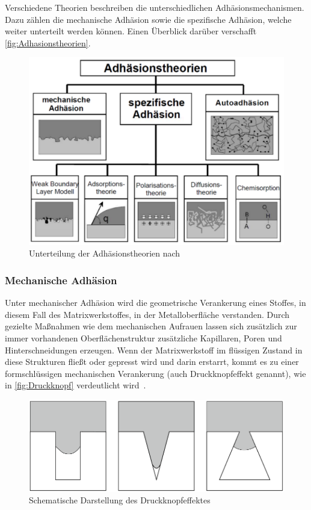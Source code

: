 Verschiedene Theorien beschreiben die unterschiedlichen Adhäsionsmechanismen.
Dazu zählen die mechanische Adhäsion sowie die spezifische Adhäsion, welche weiter unterteilt werden können.
Einen Überblick darüber verschafft \autoref{fig:Adhasionstheorien}.

\begin{figure}[H]%
    \centering
    \includegraphics[width=0.6\linewidth]{Bilder/SdT/Adhasionstheorien}
    \caption[Unterteilung der Adhäsionstheorien]{Unterteilung der Adhäsionstheorien nach~\cite{Garbassi1998}}
    \label{fig:Adhasionstheorien}
\end{figure}

\subsubsection{Mechanische Adhäsion}

Unter mechanischer Adhäsion wird die geometrische Verankerung eines Stoffes, in diesem Fall des Matrixwerkstoffes, in der Metalloberfläche verstanden.
Durch gezielte Maßnahmen wie dem mechanischen Aufrauen lassen sich zusätzlich zur immer vorhandenen Oberflächenstruktur zusätzliche Kapillaren, Poren und Hinterschneidungen erzeugen.
Wenn der Matrixwerkstoff im flüssigen Zustand in diese Strukturen fließt oder gepresst wird und darin erstarrt, kommt es zu einer formschlüssigen mechanischen Verankerung (auch Druckknopfeffekt genannt), wie in \autoref{fig:Druckknopf} verdeutlicht wird~\cite{Habenicht2009,Mittal1999}.


\begin{figure}[H]%
    \centering
    \includegraphics[width=0.6\linewidth]{Bilder/SdT/Druckknopfeffekt}
    \caption[Druckknopfeffekt]{Schematische Darstellung des Druckknopfeffektes~\cite{Mittal1999}}
    \label{fig:Druckknopf}
\end{figure}

